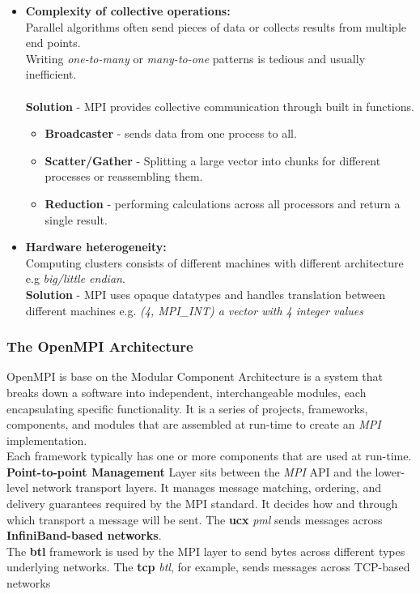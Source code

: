 \documentclass[11pt,a4paper]{article}
\begin{document}
\begin{itemize}
		\item \textbf{Complexity of collective operations:}
		\\ Parallel algorithms often send pieces of data or collects results from multiple end points. 
		\\Writing \textit{one-to-many} or \textit{many-to-one} patterns is tedious and usually inefficient.
		\\\\\textbf{Solution} - MPI provides collective communication through built in functions.
		\begin{itemize}
			\item \textbf{Broadcaster} - sends data from one process to all.
			\item \textbf{Scatter/Gather} - Splitting a large vector into chunks for different processes or reassembling them.
			\item \textbf{Reduction} -  performing calculations across all processors and return a single result.
		\end{itemize}
		
		\item \textbf{Hardware heterogeneity:}
		\\Computing clusters consists of different machines with different architecture e.g \textit{big/little endian}.
		\\\textbf{Solution} - MPI uses opaque datatypes and handles translation between different machines e.g. \textit{(4, MPI\_INT) a vector with 4 integer values}
		
	\end{itemize}
	
	\subsubsection{The OpenMPI Architecture}
	OpenMPI is base on the Modular Component Architecture is a system that breaks down a software into independent, interchangeable modules, each encapsulating specific functionality. It is a series of projects, frameworks, components, and modules that are assembled at run-time to create an \textit{MPI} implementation.
	\\Each framework typically has one or more components that are used at run-time. \textbf{Point-to-point Management} Layer sits between the \textit{MPI} API and the lower-level network transport layers. It manages message matching, ordering, and delivery guarantees required by the MPI standard. It decides how and through which transport a message will be sent. The \textbf{ucx} \textit{pml} sends messages across \textbf{InfiniBand-based networks}. 
	\\The \textbf{btl} framework is used by the MPI layer to send bytes across different types underlying networks. The \textbf{tcp} \textit{btl}, for example, sends messages across TCP-based networks
	
\end{document}
